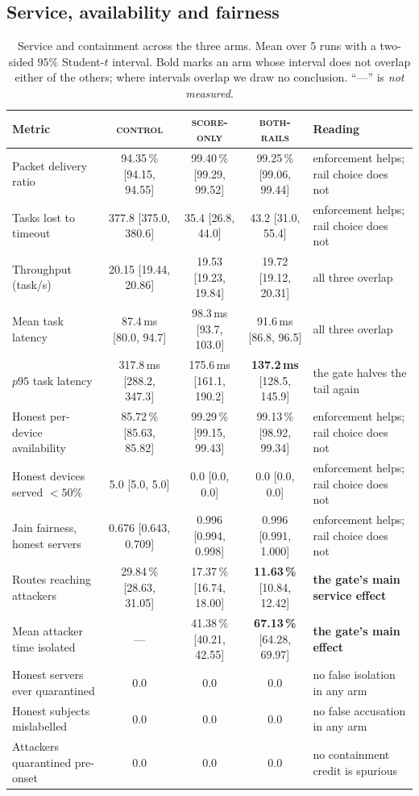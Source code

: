 \documentclass[10pt,twocolumn,letterpaper]{article}
\newcommand{\armbase}{\textsc{control}}
\newcommand{\armscore}{\textsc{score-only}}
\newcommand{\armfull}{\textsc{both-rails}}
\begin{document}
\subsection{Service, availability and fairness}
\label{sec:res:service}

\begin{table}[t]
\caption{Service and containment across the three arms. Mean over 5 runs with a
two-sided $95\%$ Student-$t$ interval. Bold marks an arm whose interval does
not overlap either of the others; where intervals overlap we draw no
conclusion. ``---'' is \emph{not measured}.}
\label{tab:service}
\centering\footnotesize
\begin{tabular}{@{}lccc l@{}}
\toprule
\textbf{Metric} & \armbase{} & \armscore{} & \armfull{} & \textbf{Reading}\\
\midrule
Packet delivery ratio        & 94.35\,\% [94.15, 94.55] & 99.40\,\% [99.29, 99.52] & 99.25\,\% [99.06, 99.44] & enforcement helps; rail choice does not\\
Tasks lost to timeout        & 377.8 [375.0, 380.6]     & 35.4 [26.8, 44.0]        & 43.2 [31.0, 55.4]        & enforcement helps; rail choice does not\\
Throughput (task/s)          & 20.15 [19.44, 20.86]     & 19.53 [19.23, 19.84]     & 19.72 [19.12, 20.31]     & all three overlap\\
Mean task latency            & 87.4\,ms [80.0, 94.7]    & 98.3\,ms [93.7, 103.0]   & 91.6\,ms [86.8, 96.5]    & all three overlap\\
$p95$ task latency           & 317.8\,ms [288.2, 347.3] & 175.6\,ms [161.1, 190.2] & \textbf{137.2\,ms} [128.5, 145.9] & the gate halves the tail again\\
Honest per-device availability& 85.72\,\% [85.63, 85.82] & 99.29\,\% [99.15, 99.43] & 99.13\,\% [98.92, 99.34] & enforcement helps; rail choice does not\\
Honest devices served $<50\%$ & 5.0 [5.0, 5.0]          & 0.0 [0.0, 0.0]           & 0.0 [0.0, 0.0]           & enforcement helps; rail choice does not\\
Jain fairness, honest servers & 0.676 [0.643, 0.709]    & 0.996 [0.994, 0.998]     & 0.996 [0.991, 1.000]     & enforcement helps; rail choice does not\\
Routes reaching attackers     & 29.84\,\% [28.63, 31.05] & 17.37\,\% [16.74, 18.00] & \textbf{11.63\,\%} [10.84, 12.42] & \textbf{the gate's main service effect}\\
Mean attacker time isolated   & ---                      & 41.38\,\% [40.21, 42.55] & \textbf{67.13\,\%} [64.28, 69.97] & \textbf{the gate's main effect}\\
\midrule
Honest servers ever quarantined & 0.0 & 0.0 & 0.0 & no false isolation in any arm\\
Honest subjects mislabelled     & 0.0 & 0.0 & 0.0 & no false accusation in any arm\\
Attackers quarantined pre-onset & 0.0 & 0.0 & 0.0 & no containment credit is spurious\\
\bottomrule
\end{tabular}
\end{table}
\end{document}
